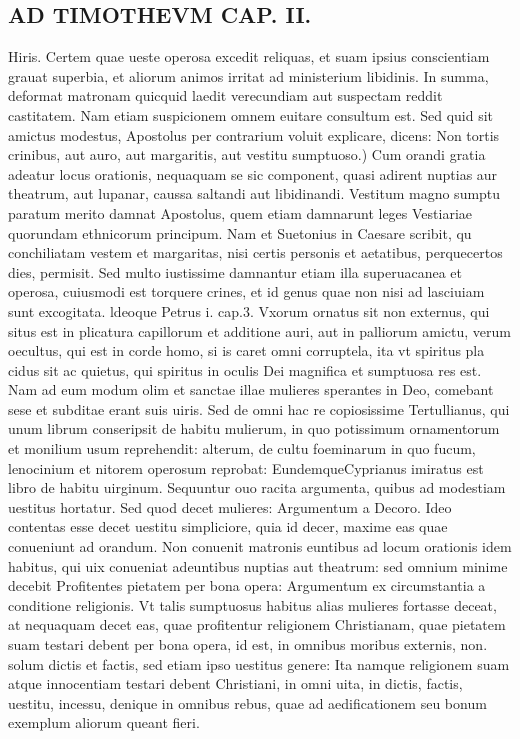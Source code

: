 \documentclass{article}
\begin{document}
\begin{pages}
\section*{AD TIMOTHEVM CAP. II. }
\marginpar{[ p.71 ]}\pstart Hiris. Certem quae ueste operosa excedit reliquas, et suam ipsius conscientiam grauat superbia, et aliorum animos irritat ad ministerium libidinis. In summa, deformat matronam quicquid laedit verecundiam aut suspectam reddit castitatem. Nam etiam suspicionem omnem euitare consultum est. Sed quid sit amictus modestus, Apostolus per contrarium voluit explicare, dicens:  \pend\pstart Non tortis crinibus, aut auro, aut margaritis, aut vestitu sumptuoso.) Cum orandi gratia adeatur locus orationis, nequaquam se sic component, quasi adirent nuptias aur theatrum, aut lupanar, caussa saltandi aut libidinandi. Vestitum magno sumptu paratum merito damnat Apostolus, quem etiam damnarunt leges Vestiariae quorundam ethnicorum principum. Nam et Suetonius in Caesare scribit, qu conchiliatam vestem et margaritas, nisi certis personis et aetatibus, perquecertos dies, permisit. Sed multo iustissime damnantur etiam illa superuacanea et operosa, cuiusmodi est torquere crines, et id genus quae non nisi ad lasciuiam sunt excogitata. ldeoque  Petrus i. cap.3. Vxorum ornatus sit non externus, qui situs est in plicatura capillorum et additione auri, aut in palliorum amictu, verum oecultus, qui est in corde homo, si is caret omni corruptela, ita vt spiritus pla cidus sit ac quietus, qui spiritus in oculis Dei magnifica et sumptuosa res est. Nam ad eum modum olim et sanctae illae mulieres sperantes in Deo, comebant sese et subditae erant suis uiris. Sed de omni hac re copiosissime Tertullianus, qui unum librum conseripsit de habitu mulierum, in quo potissimum ornamentorum et monilium usum reprehendit: alterum, de cultu foeminarum in quo fucum, lenocinium et nitorem operosum reprobat: EundemqueCyprianus imiratus est libro de habitu uirginum.  \pend\pstart Sequuntur ouo racita argumenta, quibus ad modestiam uestitus hortatur. Sed quod decet mulieres: Argumentum a Decoro. Ideo contentas esse decet uestitu simpliciore, quia id decer, maxime eas quae conueniunt ad orandum. Non conuenit matronis euntibus ad locum orationis idem habitus, qui uix conueniat adeuntibus nuptias aut theatrum: sed omnium minime decebit Profitentes pietatem per bona opera: Argumentum ex circumstantia a conditione religionis. Vt talis sumptuosus habitus alias mulieres fortasse deceat, at nequaquam decet eas, quae profitentur religionem Christianam, quae pietatem suam testari debent per bona opera, id est, in omnibus moribus externis, non. solum dictis et factis, sed etiam ipso uestitus genere: Ita namque  religionem suam atque  innocentiam testari debent Christiani, in omni uita, in dictis, factis, uestitu, incessu, denique  in omnibus rebus, quae ad aedificationem seu bonum exemplum aliorum queant fieri.  \pend
{}
{}

\end{pages}
\end{document}
